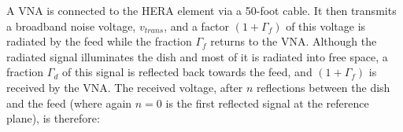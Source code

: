 \documentclass[twocolumn]{emulateapj}
\newcommand{\volt}{{v}}
\begin{document}
    
     A VNA is connected to the HERA element via a 50-foot cable. It then transmits
    a broadband noise voltage, $\volt_{trans}$, and a factor $(1+\Gamma_f)$ of this
    voltage is radiated by the feed while the fraction $\Gamma_{f}$ returns to the
    VNA. Although the radiated signal illuminates the dish and most of it is
    radiated into free space, a fraction $\Gamma_d$ of this signal is reflected
    back towards the feed, and $(1+\Gamma_f)$ is received by the VNA.  The received
    voltage, after $n$ reflections between the dish and the feed (where again $n=0$
    is the first reflected signal at the reference plane), is therefore:
    
\end{document}

